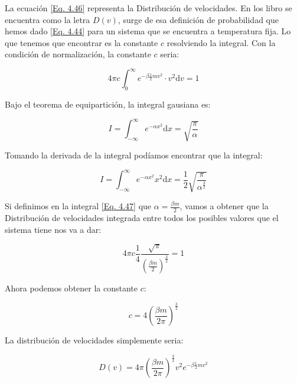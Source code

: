 \documentclass[11pt,fleqn]{book}
\begin{document}
La ecuación \ref{Eq. 4.46} representa la Distribución de velocidades. En los libro se encuentra como la letra $D(v)$, surge de esa definición de probabilidad que hemos dado \ref{Eq. 4.44} para un sistema que se encuentra a temperatura fija. Lo que tenemos que encontrar es la constante $c$ resolviendo la integral. Con la condición de normalización, la constante $c$ seria:

\begin{equation}
       4\pi c\int_{0}^{\infty}e^{-\beta\frac{1}{2}mv^{2}}\cdot v^{2}\mathrm{d}v=1
    \label{Eq. 4.47}
\end{equation}


\begin{remark}
Bajo el teorema de equipartición, la integral gausiana es:

\begin{equation*}
    I=\int_{-\infty}^{\infty}e^{-\alpha x^{2}}\mathrm{d}x=\sqrt{\frac{\pi}{\alpha}}
\end{equation*}

Tomando la derivada de la integral podíamos encontrar que la integral:

\begin{equation*}
    I=\int_{-\infty}^{\infty}e^{-\alpha x^{2}}x^{2}\mathrm{d}x=\frac{1}{2}\sqrt{\frac{\pi}{\alpha^{\frac{3}{2}}}}
\end{equation*}

\end{remark}

Si definimos en la integral \ref{Eq. 4.47} que $\alpha=\frac{\beta m}{2}$, vamos a obtener que la Distribución de velocidades integrada entre todos los posibles valores que el sistema tiene nos va a dar:

\begin{equation*}
    4\pi c\frac{1}{4}\frac{\sqrt{\pi}}{\left(\frac{\beta m}{2}\right)^{\frac{3}{2}}}=1
\end{equation*}
    
Ahora podemos obtener la constante $c$:

\begin{equation}
    c=4\left(\frac{\beta m}{2\pi}\right)^{\frac{3}{2}}
    \label{Eq. 4.48}
\end{equation}

La distribución de velocidades simplemente seria:

\begin{equation}
    D(v)=4\pi\left(\frac{\beta m}{2\pi}\right)^{\frac{3}{2}}v^{2}e^{-\beta\frac{1}{2}mv^{2}} 
    \label{Eq. 4.49}
\end{equation}
\end{document}
